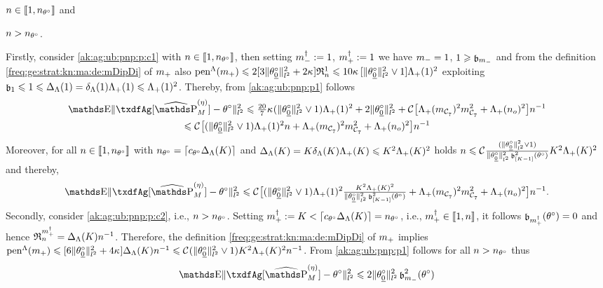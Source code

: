 \begin{pro}
\begin{inparaenum}[i]
$\ssY\in\nset{1,\ssY_{\xdf}}$ and \item\label{ak:ag:ub:pnp:p:c2}
$\ssY> \ssY_{\xdf}$. \end{inparaenum} Firstly, consider
\ref{ak:ag:ub:pnp:p:c1} with $\ssY\in\nset{1,\ssY_{\xdf}}$, then setting $\mdDi:=1$, $\pdDi:=1$ we have
$\mDi=1$, $1\geq\bias[\mDi]$ and from the definition
\eqref{freq:ge:strat:kn:ma:de:mDipDi} of  $\pDi$ also
$\penSv[\pDi]\leq2[3\Vnormlp{\xdf_{\underline{0}}}^2+2\cpen]\daRaS{1}{\xdf,\Lambda}\leq10\cpen\,[\Vnormlp{\xdf_{\underline{0}}}^2\vee1]\miSv[1]^2$
exploiting $\bias[1]\leq1\leq\DipenSv[1]=\cmSv[1]
\miSv[1]\leq\miSv[1]^2$. Thereby,  from \ref{ak:ag:ub:pnp:p1} 
follows
 \begin{multline*}
     \E\Vnormlp{\txdfAg[{\erWe[]}]-\xdf}^2\leq \tfrac{20}{7}\cpen(\Vnormlp{\xdf_{\underline{0}}}^2\vee1)\miSv[1]^2   +2\Vnormlp{\xdf_{\underline{0}}}^2
    +\cst{}\big[\miSv[\Di_{\cst{7}}]^2\Di_{\cst{7}}^2+\miSv[\ssY_{o}]^2
    \big]\ssY^{-1}\\
    \leq \cst{}\big[(\Vnormlp{\xdf_{\underline{0}}}^2\vee1)\miSv[1]^2\ssY+\miSv[\Di_{\cst{7}}]^2\Di_{\cst{7}}^2+\miSv[\ssY_{o}]^2\big]\ssY^{-1}
\end{multline*}
Moreover, for all $\ssY\in\nset{1,\ssY_{\xdf}}$ with
$\ssY_{\xdf}=\ceil{c_{\xdf}\DipenSv[K]}$ and
$\DipenSv[K]=K\cmSv[K] \miSv[K]\leq K^2\miSv[K]^2$ holds
$\ssY\leq\cst{}\tfrac{(\Vnormlp{\xdf_{\underline{0}}}^2\vee1)}{\Vnormlp{\xdf_{\underline{0}}}^2\bias[{[K-1]}]^2(\xdf)}
K^2\miSv[K]^2$and thereby, 
\begin{equation}\label{ak:ag:ub:pnp:p4}
  \E\Vnormlp{\txdfAg[{\erWe[]}]-\xdf}^2\leq
  \cst{}\big[(\Vnormlp{\xdf_{\underline{0}}}^2\vee1)\miSv[1]^2\tfrac{K^2\miSv[K]^2}{\Vnormlp{\xdf_{\underline{0}}}^2\bias[{[K-1]}]^2(\xdf)}+\miSv[\Di_{\cst{7}}]^2\Di_{\cst{7}}^2+\miSv[\ssY_{o}]^2\big]\ssY^{-1}.
\end{equation}
Secondly, consider \ref{ak:ag:ub:pnp:p:c2}, i.e., $\ssY>
\ssY_{\xdf}$. Setting
$\pdDi:=K< \ceil{c_{\xdf}\DipenSv[K]}=\ssY_{\xdf}$, i.e.,
$\pdDi\in\nset{1,\ssY}$, it follows $\bias[\pdDi](\xdf)=0$ and hence
$\daRaS{\pdDi}{\xdf,\Lambda}= \DipenSv[K] \ssY^{-1}$.  Therefore, the
definition \eqref{freq:ge:strat:kn:ma:de:mDipDi} of $\pDi$ implies
$\pen^{\Lambda}(\pDi)\leq[6\Vnormlp{\xdf_{\underline{0}}}^2+ 4\cpen]\DipenSv[K]
\ssY^{-1}\leq
\cst{}(\Vnormlp{\xdf_{\underline{0}}}^2\vee1)K^2\miSv[K]^2\ssY^{-1}$. From
\eqref{ak:ag:ub:pnp:p1} follows for all $\ssY> \ssY_{\xdf}$ thus
\begin{multline}\label{ak:ag:ub:pnp:p5}
  \E\Vnormlp{\txdfAg[{\erWe[]}]-\xdf}^2\leq 2\Vnormlp{\xdf_{\underline{0}}}^2\bias[\mDi]^2(\xdf)

\end{multline}
\end{pro}
